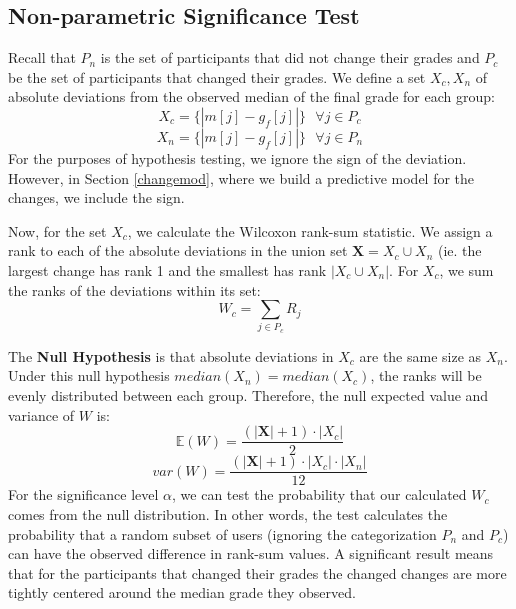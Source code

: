 \subsection{Non-parametric Significance Test}
Recall that $P_n$ is the set of participants that did not change their grades and $P_c$ be the set of participants that changed their grades.
We define a set $X_c,X_n$ of absolute deviations from the observed median of the final grade for each group:
\begin{equation}
X_c = \{|m[j] - g_f[j]|\}\text{ }\forall j \in P_c
\end{equation}
\begin{equation}
X_n = \{|m[j] - g_f[j]|\}\text{ }\forall j \in P_n
\end{equation}
For the purposes of hypothesis testing, we ignore the sign of the deviation.
However, in Section \ref{changemod}, where we build a predictive model for the changes, we include the sign.

Now, for the set $X_c$, we calculate the Wilcoxon rank-sum statistic.
We assign a rank to each of the absolute deviations in the union set $\textbf{X} = X_c \cup X_n$ (ie. the largest change has rank 1 and the smallest has rank $|X_c \cup X_n|$.
For $X_c$, we sum the ranks of the deviations within its set:
\begin{equation}
W_c = \sum_{j \in P_c} R_j
\end{equation}

The \textbf{Null Hypothesis} is that absolute deviations in $X_c$ are the same size as $X_n$. 
Under this null hypothesis $median(X_n) = median(X_c)$, the ranks will be evenly distributed between each group. 
Therefore, the null expected value and variance of $W$ is:
\begin{equation}
\mathbb{E}(W) = \frac{(|\textbf{X}| + 1)\cdot |X_c|}{2}
\end{equation}
\begin{equation}
var(W) = \frac{(|\textbf{X}| + 1)\cdot |X_c| \cdot |X_n|}{12}
\end{equation}
For the significance level $\alpha$, we can test the probability that our calculated $W_c$ comes from the null distribution.
In other words, the test calculates the probability that a random subset of users (ignoring the categorization $P_n$ and $P_c$) can have the observed difference in rank-sum values.
A significant result means that for the participants that changed their grades the changed changes are more tightly centered around the median grade they observed.

